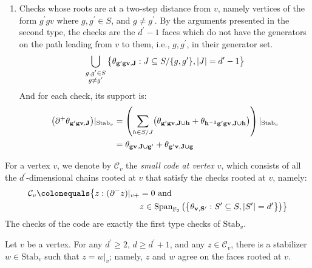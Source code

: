 \begin{enumerate}
\begin{equation*}
\begin{split}
      \end{split}
    \end{equation*}
  \item Checks whose roots are at a two-step distance from $v$, namely vertices of the form $g^{\prime}gv$ where $g, g^{\prime} \in S$, and $g \neq g^{\prime}$. By the arguments presented in the second type, the checks are the $d^{\prime}-1$ faces which do not have the generators on the path leading from $v$ to them, i.e., $g, g^{\prime}$, in their generator set.
    \begin{equation*}
      \begin{split}
        \bigcup_{\substack{g,g^{\prime}\in S\\g\ne g^{\prime}}}\big\{ \mathbf{\theta_{g^{\prime}gv ,J} }: J \subseteq S/\{g,g^{\prime}\}, |J|=d^{\prime}-1 \big\}
      \end{split}
    \end{equation*}
  And for each check, its support is:
    \begin{equation*}
      \begin{split}
        \bigl(\partial^+\mathbf{\theta_{g'g v ,J} }\bigr)|_{\text{Stab}_v}
        &=\left(\sum_{h\in S/J}\bigl(\mathbf{\theta_{g'gv ,J\cup h} }
                +\mathbf{\theta_{h^{-1}g'gv ,J\cup h} }\bigr)\right)|_{\text{Stab}_v}\\
        &=\mathbf{\theta_{gv ,J\cup g'} }+\mathbf{\theta_{g'v ,J\cup g} }
      \end{split}
    \end{equation*}
\end{enumerate}

\begin{definition}
For a vertex $v$, we denote by $\mathcal{C}_{v}$ the \textit{small code at vertex $v$}, which consists of all the $d^{\prime}$-dimensional chains rooted at $v$ that satisfy the checks rooted at $v$, namely:
  \begin{align*}
    \mathcal{C}_{v} \colonequals  \bigl\{ z : (\partial^{-} z)|_{v+}  &= 0 \text{ and } \\
    & z \in \operatorname{Span}_{\mathbb F_2} \big(  \big\{  \rotfvs{} : S^{\prime} \subseteq S, |S^{\prime}| = d^{\prime}  \big\} \big) \bigr\} 
  \end{align*}
The checks of the code are exactly the first type checks of $\text{Stab}_{v}$.
\end{definition}
\begin{claim}
  \label{claim:agreement}
  Let $v$ be a vertex. For any $d^{\prime}\ge 2$, $d\ge d^{\prime}+1$, and any $z \in \mathcal{C}_{v}$, there is a stabilizer $w \in \text{Stab}_{v}$ such that $z = w|_{v}$; namely, $z$ and $w$ agree on the faces rooted at $v$.
\end{claim}


